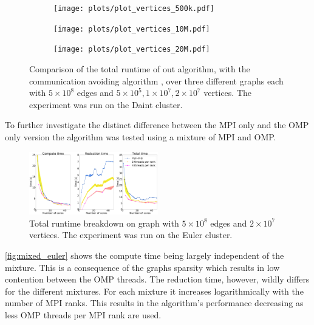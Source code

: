 \newlength{\fsize}
\setlength{\fsize}{0.5\textwidth}
\begin{figure}
    \begin{subfigure}[c]{\fsize}
        \texttt{[image: plots/plot\_vertices\_500k.pdf]}
        \label{fig:mpi_omp_commavoiding_daint_1}
    \end{subfigure}
\begin{subfigure}[c]{\fsize}
    \texttt{[image: plots/plot\_vertices\_10M.pdf]}
    \label{fig:mpi_omp_commavoiding_daint_2}
\end{subfigure}
    \begin{subfigure}[c]{\fsize}
        \texttt{[image: plots/plot\_vertices\_20M.pdf]}
\label{fig:mpi_omp_commavoiding_daint_3}
    \end{subfigure}
    \caption{Comparison of the total runtime of out algorithm, with the communication avoiding
    algorithm \cite{comm_avoiding}, over three different graphs each with $5\times10^{8}$ edges
    and $5\times10^5, 1\times10^7, 2\times10^7$ vertices. The experiment was run on the Daint cluster.}
    \label{fig:mpi_omp_commavoiding_daint}
\end{figure}

To further investigate the distinct difference between the MPI only and the OMP only version the algorithm was tested using a mixture of MPI and OMP.

\begin{figure}
\includegraphics[width=0.5\textwidth]{plots/20000mpi_mixtures_with_everything}
\caption{Total runtime breakdown on graph with $5\times10^{8}$ edges and $2\times10^{7}$ vertices. The experiment was run on the Euler cluster.}
\label{fig:mixed_euler}
\end{figure}

\autoref{fig:mixed_euler} shows the compute time being largely independent of the mixture. This is a consequence of the graphs sparsity which results in low contention between the OMP threads. The reduction time, however, wildly differs for the different mixtures. For each mixture it increases logarithmically with the number of MPI ranks. This results in the algorithm's performance decreasing as less OMP threads per MPI rank are used.

